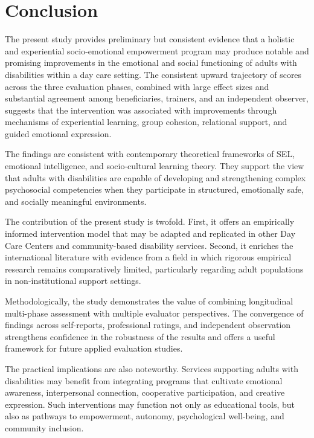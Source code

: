 \documentclass[journal]{IEEEtran}
\begin{document}
\section{Conclusion}

The present study provides preliminary but consistent evidence that a holistic and experiential socio-emotional empowerment program may produce notable and promising improvements in the emotional and social functioning of adults with disabilities within a day care setting. The consistent upward trajectory of scores across the three evaluation phases, combined with large effect sizes and substantial agreement among beneficiaries, trainers, and an independent observer, suggests that the intervention was associated with improvements through mechanisms of experiential learning, group cohesion, relational support, and guided emotional expression.

The findings are consistent with contemporary theoretical frameworks of SEL, emotional intelligence, and socio-cultural learning theory. They support the view that adults with disabilities are capable of developing and strengthening complex psychosocial competencies when they participate in structured, emotionally safe, and socially meaningful environments.

The contribution of the present study is twofold. First, it offers an empirically informed intervention model that may be adapted and replicated in other Day Care Centers and community-based disability services. Second, it enriches the international literature with evidence from a field in which rigorous empirical research remains comparatively limited, particularly regarding adult populations in non-institutional support settings.

Methodologically, the study demonstrates the value of combining longitudinal multi-phase assessment with multiple evaluator perspectives. The convergence of findings across self-reports, professional ratings, and independent observation strengthens confidence in the robustness of the results and offers a useful framework for future applied evaluation studies.

The practical implications are also noteworthy. Services supporting adults with disabilities may benefit from integrating programs that cultivate emotional awareness, interpersonal connection, cooperative participation, and creative expression. Such interventions may function not only as educational tools, but also as pathways to empowerment, autonomy, psychological well-being, and community inclusion.
\end{document}
